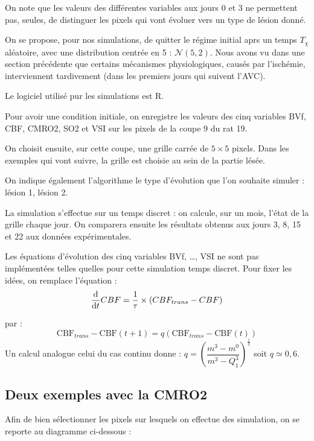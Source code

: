 \etoile
On note que les valeurs des diff\'erentes variables aux jours 0 et 3 ne permettent pas, seules, %
de distinguer les pixels qui vont \'evoluer vers un type de l\'esion donn\'e.

\par
On se propose, pour nos simulations, de quitter le r\'egime initial aprs un temps $T_{\chi}$ al\'eatoire, %
avec une distribution centr\'ee en 5 : $\mathcal{N}(5,2)$. %
Nous avons vu dans une section pr\'ec\'edente que certains m\'ecanismes physiologiques, %
caus\'es par l'isch\'emie, interviennent tardivement (dans les premiers jours qui suivent l'AVC).

\ligneinter
Le logiciel utilis\'e pur les simulations est R.

\par
Pour avoir une condition initiale, on enregistre les valeurs des cinq variables BVf, CBF, CMRO2, SO2 et VSI sur les pixels de la coupe 9 du rat 19.

\par
On choisit ensuite, sur cette coupe, une grille carr\'ee de $5\times 5$ pixels. %
Dans les exemples qui vont suivre, la grille est choisie au sein de la partie l\'es\'ee.

\par
On indique \'egalement  l'algorithme le type d'\'evolution que l'on souhaite simuler : l\'esion 1, l\'esion 2.

\par
La simulation s'effectue sur un temps discret : on calcule, sur un mois, l'\'etat de la grille chaque jour. %
On comparera ensuite les r\'esultats obtenus aux jours 3, 8, 15 et 22 aux donn\'ees exp\'erimentales.

\etoile
Les \'equations d'\'evolution des cinq variables BVf, \dots , VSI ne sont pas impl\'ement\'ees %
telles quelles pour cette simulation  temps discret. %
Pour fixer les id\'ees, on remplace l'\'equation :
\[\frac{\text{d}}{\text{d}t}CBF=\frac{1}{\tau}\times \left(CBF_{trans}-CBF\right)\]

par :
\[\text{CBF}_{trans}-\text{CBF}(t+1)=q\left(\text{CBF}_{trans}-\text{CBF}(t)\right)\]
Un calcul analogue  celui du cas continu donne : %
$q =\left(\dfrac{m^3-m^0}{m^3-Q^3_1}\right)^{\frac{1}{3}}$ soit $q\simeq 0,6$.


\subsection{Deux exemples avec la CMRO2}


Afin de bien s\'electionner les pixels sur lesquels on effectue des simulation, on se reporte au diagramme ci-dessous :


